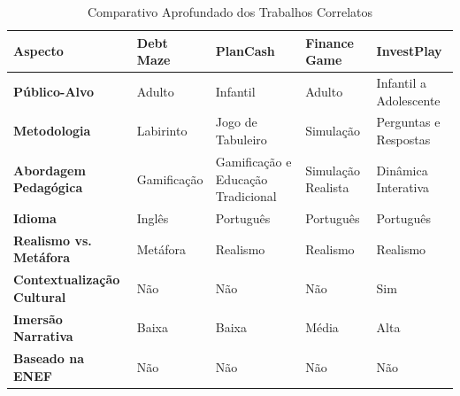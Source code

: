 \begin{table}[!htbp]
	\centering
	\renewcommand{\arraystretch}{1.3}
	\caption{Comparativo Aprofundado dos Trabalhos Correlatos}%
	\label{tab:comparativo-trabalhos}
	\begin{tabular}{| L{3cm} | L{2.7cm} | L{2.7cm} | L{2.7cm} | L{2.7cm} |}
		\hline
		\textbf{Aspecto}                   & \textbf{Debt Maze} & \textbf{PlanCash}                  & \textbf{Finance Game} & \textbf{InvestPlay}    \\
		\hline
		\hline
		\textbf{Público-Alvo}              & Adulto             & Infantil                           & Adulto                & Infantil a Adolescente \\
		\hline
		\textbf{Metodologia}               & Labirinto          & Jogo de Tabuleiro                  & Simulação             & Perguntas e Respostas  \\
		\hline
		\textbf{Abordagem Pedagógica}      & Gamificação        & Gamificação e Educação Tradicional & Simulação Realista    & Dinâmica Interativa    \\
		\hline
		\textbf{Idioma}                    & Inglês             & Português                          & Português             & Português              \\
		\hline
		\textbf{Realismo vs. Metáfora}     & Metáfora           & Realismo                           & Realismo              & Realismo               \\
		\hline
		\textbf{Contextualização Cultural} & Não                & Não                                & Não                   & Sim                    \\
		\hline
		\textbf{Imersão Narrativa}         & Baixa              & Baixa                              & Média                 & Alta                   \\
		\hline
		\textbf{Baseado na ENEF}           & Não                & Não                                & Não                   & Não                    \\
		\hline
	\end{tabular}
	\vspace{2mm}
\end{table}